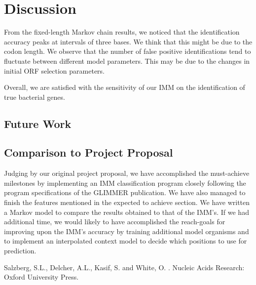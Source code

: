 \documentclass[11pt,letterpaper]{article}
\begin{document}
\section{Discussion}
From the fixed-length Markov chain results, we noticed that the identification accuracy peaks at intervals of three bases. We think that this might be due to the codon length. We observe that the number of false positive identifications tend to fluctuate between different model parameters. This may be due to the changes in initial ORF selection parameters.

Overall, we are satisfied with the sensitivity of our IMM on the identification of true bacterial genes.


\subsection{Future Work}
\subsection{Comparison to Project Proposal}
Judging by our original project proposal, we have accomplished the must-achieve milestones by implementing an IMM classification program closely following the program specifications of the GLIMMER publication. We have also managed to finish the features mentioned in the expected to achieve section. We have written a Markov model to compare the results obtained to that of the IMM’s. If we had additional time, we would likely to have accomplished the reach-goals for improving upon the IMM’s accuracy by training additional model organisms and to implement an interpolated context model to decide which positions to use for prediction.


\begin{thebibliography}{}

Salzberg, S.L., Delcher, A.L., Kasif, S. and White, O.
.
\newblock Nucleic Acids Research: Oxford University Press.

\end{thebibliography}
\end{document}
